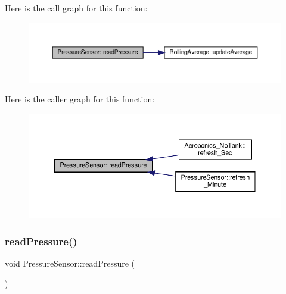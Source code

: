 Here is the call graph for this function\+:
\nopagebreak
\begin{figure}[H]
\begin{center}
\leavevmode
\includegraphics[width=350pt]{class_pressure_sensor_a7a16702239fcf55a72e91c45fe4002ac_cgraph}
\end{center}
\end{figure}
Here is the caller graph for this function\+:
\nopagebreak
\begin{figure}[H]
\begin{center}
\leavevmode
\includegraphics[width=350pt]{class_pressure_sensor_a7a16702239fcf55a72e91c45fe4002ac_icgraph}
\end{center}
\end{figure}
\mbox{\label{class_pressure_sensor_a7a16702239fcf55a72e91c45fe4002ac}} 
\subsubsection{\texorpdfstring{read\+Pressure()}{readPressure()}\hspace{0.1cm}{\footnotesize\ttfamily [2/2]}}
{\footnotesize\ttfamily void Pressure\+Sensor\+::read\+Pressure (\begin{DoxyParamCaption}{ }\end{DoxyParamCaption})}

\mbox{\label{class_pressure_sensor_a1081c5a1073a4c5d0c790f92e53febf0}} 
